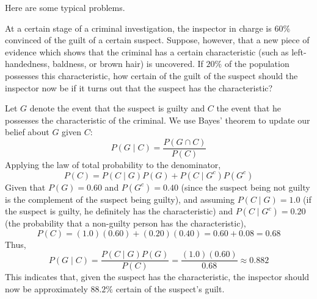        Here are some typical problems.
       \begin{example}
       	At a certain stage of a criminal investigation, the inspector in charge is \(60\%\) convinced of the guilt of a certain suspect. Suppose, however, that a new piece of evidence which shows that the criminal has a certain characteristic (such as left-handedness, baldness, or brown hair) is uncovered. If \(20\%\) of the population possesses this characteristic, how certain of the guilt of the suspect should the inspector now be if it turns out that the suspect has the characteristic?
       	\begin{solution}
       		Let \( G \) denote the event that the suspect is guilty and \( C \) the event that he possesses the characteristic of the criminal. We use Bayes' theorem to update our belief about \( G \) given \( C \):
       		\[
       		P(G \mid C) = \frac{P(G \cap C)}{P(C)}
       		\]
       		Applying the law of total probability to the denominator,
       		\[
       		P(C) = P(C \mid G)P(G) + P(C \mid G^c)P(G^c)
       		\]
       		Given that \( P(G) = 0.60 \) and \( P(G^c) = 0.40 \) (since the suspect being not guilty is the complement of the suspect being guilty), and assuming \( P(C \mid G) = 1.0 \) (if the suspect is guilty, he definitely has the characteristic) and \( P(C \mid G^c) = 0.20 \) (the probability that a non-guilty person has the characteristic),
       		\[
       		P(C) = (1.0)(0.60) + (0.20)(0.40) = 0.60 + 0.08 = 0.68
       		\]
       		Thus,
       		\[
       		P(G \mid C) = \frac{P(C \mid G)P(G)}{P(C)} = \frac{(1.0)(0.60)}{0.68} \approx 0.882
       		\]
       		This indicates that, given the suspect has the characteristic, the inspector should now be approximately \(88.2\%\) certain of the suspect's guilt.
       	\end{solution}
       \end{example}
       
